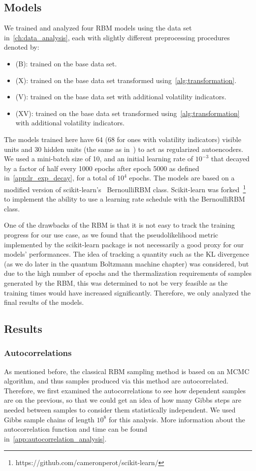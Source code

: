 \subsection{Models}
We trained and analyzed four RBM models using the data set in~\cref{ch:data_analysis}, each with slightly different preprocessing procedures denoted by:
\begin{itemize}
    \item (B): trained on the base data set.
    \item (X): trained on the base data set transformed using~\cref{alg:transformation}.
    \item (V): trained on the base data set with additional volatility indicators.
    \item (XV): trained on the base data set transformed using~\cref{alg:transformation} with additional volatility indicators.
\end{itemize}
The models trained here have 64 (68 for ones with volatility indicators) visible units and 30 hidden units (the same as in~\cite{kondratyev_2019}) to act as regularized autoencoders.
We used a mini-batch size of 10, and an initial learning rate of \( 10^{-3} \) that decayed by a factor of half every 1000 epochs after epoch 5000 as defined in~\cref{app:lr_exp_decay}, for a total of \( 10^4 \) epochs.
The models are based on a modified version of scikit-learn's~\cite{python_sklearn} BernoulliRBM class.
Scikit-learn was forked~\footnote{https://github.com/cameronperot/scikit-learn/} to implement the ability to use a learning rate schedule with the BernoulliRBM class.

One of the drawbacks of the RBM is that it is not easy to track the training progress for our use case, as we found that the pseudolikelihood metric implemented by the scikit-learn package is not necessarily a good proxy for our models' performances.
The idea of tracking a quantity such as the KL divergence (as we do later in the quantum Boltzmann machine chapter) was considered, but due to the high number of epochs and the thermalization requirements of samples generated by the RBM, this was determined to not be very feasible as the training times would have increased significantly.
Therefore, we only analyzed the final results of the models.

\subsection{Results}
\subsubsection{Autocorrelations}
As mentioned before, the classical RBM sampling method is based on an MCMC algorithm, and thus samples produced via this method are autocorrelated.
Therefore, we first examined the autocorrelations to see how dependent samples are on the previous, so that we could get an idea of how many Gibbs steps are needed between samples to consider them statistically independent.
We used Gibbs sample chains of length \( 10^8 \) for this analysis.
More information about the autocorrelation function and time can be found in~\cref{app:autocorrelation_analysis}.

